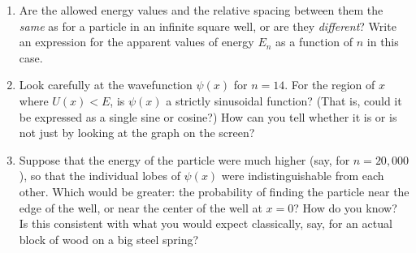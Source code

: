 \begin{enumerate}[wide]
\item Are the allowed energy values and the relative spacing between them the \textit{same} as for a particle in an infinite square well, or are they \textit{different}?  Write an expression for the apparent values of energy $E_n$ as a function of $n$ in this case.
\answerspace{1.0in}

\item Look carefully at the wavefunction $\psi(x)$ for $n=14$.  For the region of $x$ where $U(x)<E$, is $\psi(x)$ a strictly sinusoidal function?  (That is, could it be expressed as a single sine or cosine?)  How can you tell whether it is or is not just by looking at the graph on the screen?  
\answerspace{1.0in}

\item Suppose that the energy of the particle were much higher (say, for $n=20,000$), so that the individual lobes of $\psi(x)$ were indistinguishable from each other.  Which would be greater: the probability of finding the particle near the edge of the well, or near the center of the well at $x = 0$?  How do you know?  Is this consistent with what you would expect classically, say, for an actual block of wood on a big steel spring?
\answerspace{0.8in}
\end{enumerate}
